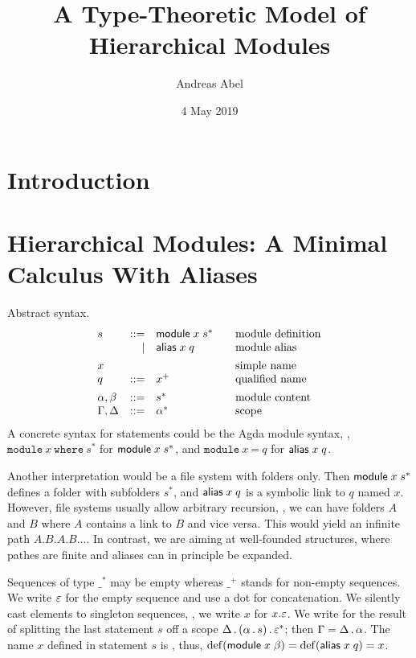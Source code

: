 \documentclass{article}
\title{A Type-Theoretic Model of Hierarchical Modules}
\author{Andreas Abel}
\date{4 May 2019}
\theoremstyle{definition}
\theoremstyle{plain}
\theoremstyle{remark}
\begin{document}
\maketitle

\begin{abstract}
\end{abstract}

\section{Introduction}
\label{sec:intro}

\section{Hierarchical Modules: A Minimal Calculus With Aliases}

Abstract syntax.
\[
\begin{array}{lrl@{\qquad}l}
  s & ::=  & \mdef x {s^*}    & \mbox{module definition} \\
    & \mid & \malias x q      & \mbox{module alias}  \\[1ex]
  x &  &                      & \mbox{simple name}       \\
  q & ::=  & x^+              & \mbox{qualified name}    \\[1ex]
  \alpha,\beta  & ::= & s^*   & \mbox{module content}    \\
  \Gamma,\Delta & ::= & \Ga^* & \mbox{scope}             \\
\end{array}
\]
A concrete syntax for statements could be the Agda module syntax, \ie,
$\texttt{module}~x~\texttt{where}~s^*$ for $\mathsf{module}\;x\;s^*$, and
$\texttt{module}~x~\texttt{=}~q$ for $\mathsf{alias}\;x\;q$.

Another interpretation would be a file system with folders only.  Then
$\mathsf{module}\;x\;s^*$ defines a folder with subfolders $s^*$, and $\mathsf{alias}\;x\;q$ is a symbolic link to $q$ named $x$.  However, file systems usually
allow arbitrary recursion, \eg, we can have folders $A$ and $B$ where
$A$ contains a link to $B$ and vice versa.  This would yield an
infinite path $A.B.A.B...$. In contrast, we are aiming
at well-founded structures, where pathes are finite and
aliases can in principle be expanded.

Sequences of type $\_^*$ may be empty whereas $\_^+$ stands for
non-empty sequences.
We write $\varepsilon$ for the empty sequence and use a dot %
for concatenation.
We silently cast elements to singleton sequences, \eg,
we write $x$ for $x.\varepsilon$.
We write  for the result of splitting the last
statement $s$ off a scope $\Delta \,.\, (\alpha \,.\, s) \,.\, \varepsilon^*$;
then $\Gamma = \Delta \,.\, \alpha$.
The name $x$ defined in statement $s$ is , thus,
$\mathop{\mathrm{def}}(\mathsf{module}\;x\;\beta) = \mathop{\mathrm{def}}(\mathsf{alias}\;x\;q) = x$.
\end{document}
